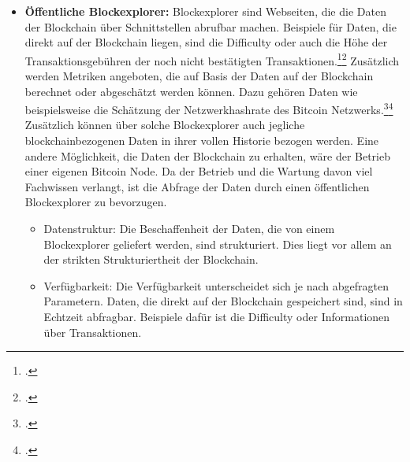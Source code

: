 \begin{itemize}
    \item \textbf{Öffentliche Blockexplorer: }Blockexplorer sind Webseiten, die die Daten der Blockchain über Schnittstellen
    abrufbar machen. Beispiele für Daten, die direkt auf der Blockchain liegen, sind die Difficulty oder auch die Höhe der
    Transaktionsgebühren der noch nicht bestätigten
    Transaktionen.\footcite[Cf.][]{bitcoin2021getdifficulty}\footcite[Cf.][]{bitcoin2021getrawmempool} Zusätzlich werden
    Metriken angeboten, die auf Basis der Daten auf der Blockchain berechnet oder abgeschätzt werden können. Dazu gehören
    Daten wie beispielsweise die Schätzung der Netzwerkhashrate des Bitcoin
    Netzwerks.\footcite[Cf.][]{blockchain2021total}\footcite[Cf.][]{blockchain2021api} Zusätzlich können über solche
    Blockexplorer auch jegliche blockchainbezogenen Daten in ihrer vollen Historie bezogen werden. Eine andere Möglichkeit,
    die Daten der Blockchain zu erhalten, wäre der Betrieb einer eigenen Bitcoin Node. Da der Betrieb und die Wartung davon
    viel Fachwissen verlangt, ist die Abfrage der Daten durch einen öffentlichen Blockexplorer zu bevorzugen.
    \begin{itemize}
        \item Datenstruktur: Die Beschaffenheit der Daten, die von einem Blockexplorer geliefert werden, sind strukturiert.
        Dies liegt vor allem an der strikten Strukturiertheit der Blockchain.
        \item Verfügbarkeit: Die Verfügbarkeit unterscheidet sich je nach abgefragten Parametern. Daten, die direkt auf
        der Blockchain gespeichert sind, sind in Echtzeit abfragbar. Beispiele dafür ist die Difficulty oder Informationen
        über Transaktionen.
        

\end{itemize}
\end{itemize}
